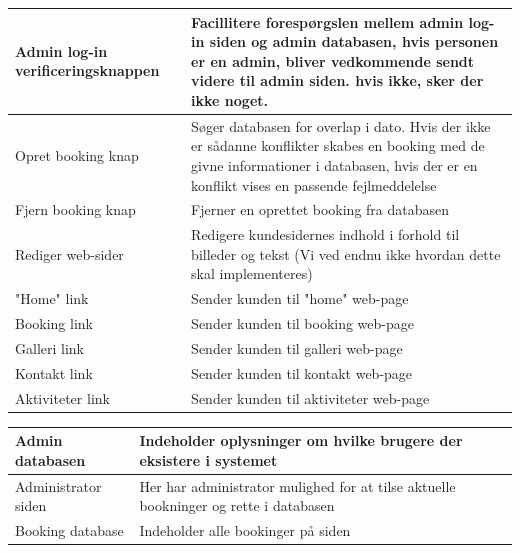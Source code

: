\documentclass[12pt,a4paper]{article}
\begin{document}
\begin{minipage}{\textwidth}

 \label{tab:title}
\begin{tabular}{| p{5cm} | p{10cm} |}
\hline Admin log-in \newline verificeringsknappen & Facillitere forespørgslen mellem admin log-in siden og admin databasen, hvis personen er en admin, bliver vedkommende sendt videre til admin siden. hvis ikke, sker der ikke noget.\\
\hline Opret booking knap & Søger databasen for overlap i dato. Hvis der ikke er sådanne konflikter skabes en booking med de givne informationer i databasen, hvis der er en konflikt vises en passende fejlmeddelelse \\
\hline Fjern booking knap & Fjerner en oprettet booking fra databasen \\
\hline Rediger web-sider & Redigere kundesidernes indhold i forhold til billeder og tekst (Vi ved endnu ikke hvordan dette skal implementeres) \\
\hline "Home" link & Sender kunden til "home" web-page \\
\hline Booking link & Sender kunden til booking web-page \\
\hline Galleri link & Sender kunden til galleri web-page \\
\hline Kontakt link & Sender kunden til kontakt web-page \\
\hline Aktiviteter link & Sender kunden til aktiviteter web-page \\
\hline
\end{tabular}

\end{minipage}

\bigskip

\begin{minipage}{\textwidth}

 \label{tab:title}
\begin{tabular}{| p{5cm} | p{10cm} |}
\hline Admin databasen & Indeholder oplysninger om hvilke brugere der eksistere i systemet \\
\hline Administrator siden & Her har administrator mulighed for at tilse aktuelle bookninger og rette i databasen \\
\hline Booking database & Indeholder alle bookinger på siden \\
\hline
\end{tabular}

\end{minipage}
\newpage
\end{document}
